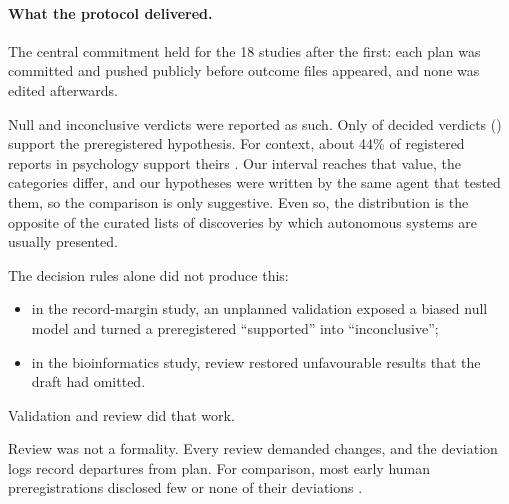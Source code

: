 \paragraph{What the protocol delivered.} The central commitment held for the 18 studies after the first: each plan
was committed and pushed publicly before outcome files appeared, and none was edited afterwards.

Null and inconclusive verdicts were reported as such. Only \VerdictSupported{} of \VerdictsDecided{} decided verdicts
(\CISupported{}) support the preregistered hypothesis. For context, about 44\% of registered reports in psychology
support theirs \citep{scheel2021positive}. Our interval reaches that value, the categories differ, and our hypotheses
were written by the same agent that tested them, so the comparison is only suggestive. Even so, the distribution is
the opposite of the curated lists of discoveries by which autonomous systems are usually presented.

The decision rules alone did not produce this:
\begin{itemize}
\item in the record-margin study, an unplanned validation exposed a biased null model and turned a preregistered
``supported'' into ``inconclusive'';
\item in the bioinformatics study, review restored unfavourable results that the draft had omitted.
\end{itemize}
Validation and review did that work.

Review was not a formality. Every review demanded changes, and the deviation logs record \DevN{} departures from plan.
For comparison, most early human preregistrations disclosed few or none of their deviations \citep{claesen2021dream}.

